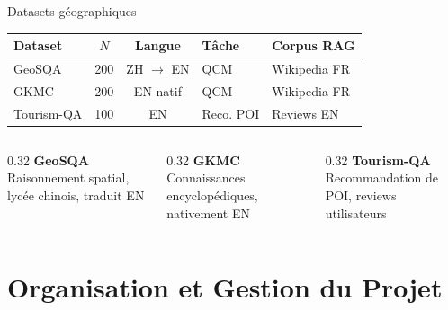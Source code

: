 \documentclass[aspectratio=169, 12pt]{beamer}
\begin{document}
\begin{frame}{Datasets g\'eographiques}
  \begin{table}
    \centering
    \small
    \begin{tabular}{@{} l c c l l @{}}
      \toprule
      \textbf{Dataset} & \textbf{$N$} & \textbf{Langue} & \textbf{T\^ache} & \textbf{Corpus RAG} \\
      \midrule
      GeoSQA & 200 & ZH $\to$ EN & QCM & Wikipedia FR \\
      GKMC & 200 & EN natif & QCM & Wikipedia FR \\
      Tourism-QA & 100 & EN & Reco. POI & Reviews EN \\
      \bottomrule
    \end{tabular}
  \end{table}

  \vspace{0.3cm}

  \begin{columns}[T]
    \begin{column}{0.32\textwidth}
      \centering
      \textbf{GeoSQA}\\
      \small Raisonnement spatial, lyc\'ee chinois, traduit EN
    \end{column}
    \begin{column}{0.32\textwidth}
      \centering
      \textbf{GKMC}\\
      \small Connaissances encyclop\'ediques, nativement EN
    \end{column}
    \begin{column}{0.32\textwidth}
      \centering
      \textbf{Tourism-QA}\\
      \small Recommandation de POI, reviews utilisateurs
    \end{column}
  \end{columns}
\end{frame}

\section{Organisation et Gestion du Projet}
\end{document}
